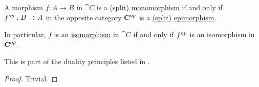 \begin{proposition}\label{thm:morphism_invertibility_duality}
  A morphism \( f: A \to B \) in \( \cat{C} \) is a \hyperref[def:morphism_invertibility/left_invertible]{(split)} \hyperref[def:morphism_invertibility/left_cancellative]{monomorphism} if and only if \( f^{op}: B \to A \) in the opposite category \( \operatorname{\mathbf{C}}^{op} \) is a \hyperref[def:morphism_invertibility/right_invertible]{(split)} \hyperref[def:morphism_invertibility/right_cancellative]{epimorphism}.

  In particular, \( f \) is an \hyperref[def:morphism_invertibility/isomorphism]{isomorphism} in \( \cat{C} \) if and only if \( f^{op} \) is an isomorphism in \( \operatorname{\mathbf{C}}^{op} \).

  This is part of the duality principles listed in .
\end{proposition}
\begin{proof}
  Trivial.
\end{proof}

